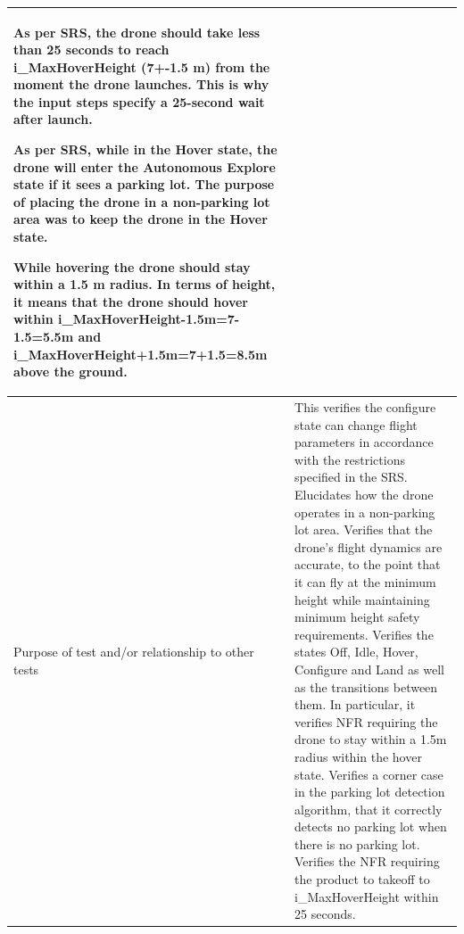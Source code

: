 \documentclass[12pt, titlepage]{article}
\begin{document}
\begin{enumerate}
\begin{table}[!h]
\begin{center}
\begin{tabular}{ | m{1.5cm} | m{15cm} | }
As per SRS, the drone should take less than 25 seconds to reach i\_MaxHoverHeight (7+-1.5 m) from the moment the drone launches. This is why the input steps specify a 25-second wait after launch.

As per SRS, while in the Hover state, the drone will enter the Autonomous Explore state if it sees a parking lot. The purpose of placing the drone in a non-parking lot area was to keep the drone in the Hover state.

While hovering the drone should stay within a 1.5 m radius. In terms of height, it means that the drone should hover within i\_MaxHoverHeight-1.5m=7-1.5=5.5m and i\_MaxHoverHeight+1.5m=7+1.5=8.5m above the ground.  
\\ 
\hline
Purpose of test and/or relationship to other tests & This verifies the configure state can change flight parameters in accordance with the restrictions specified in the SRS. 
Elucidates how the drone operates in a non-parking lot area.
Verifies that the drone's flight dynamics are accurate, to the point that it can fly at the minimum height while maintaining minimum height safety requirements.
Verifies the states Off, Idle, Hover, Configure and Land as well as the transitions between them. In particular, it verifies NFR requiring the drone to stay within a 1.5m radius within the hover state. 
Verifies a corner case in the parking lot detection algorithm, that it correctly detects no parking lot when there is no parking lot.
Verifies the NFR requiring the product to takeoff to i\_MaxHoverHeight within 25 seconds. \\ 
\hline
\end{tabular}
\end{center}
\end{table}


\end{enumerate}
\end{document}
